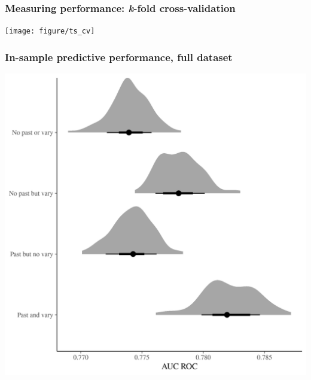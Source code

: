 \documentclass{beamer}
\begin{document}
\begin{frame}
  \frametitle{Measuring performance: \textit{k}-fold cross-validation}

  \begin{center}
    \texttt{[image: figure/ts\_cv]}
  \end{center}


\end{frame}


\begin{frame}
  \frametitle{In-sample predictive performance, full dataset}

  \includegraphics[width=\textwidth,height=0.8\textheight,keepaspectratio=true]{../results/figure/auc_hist}

\end{frame}
\end{document}
